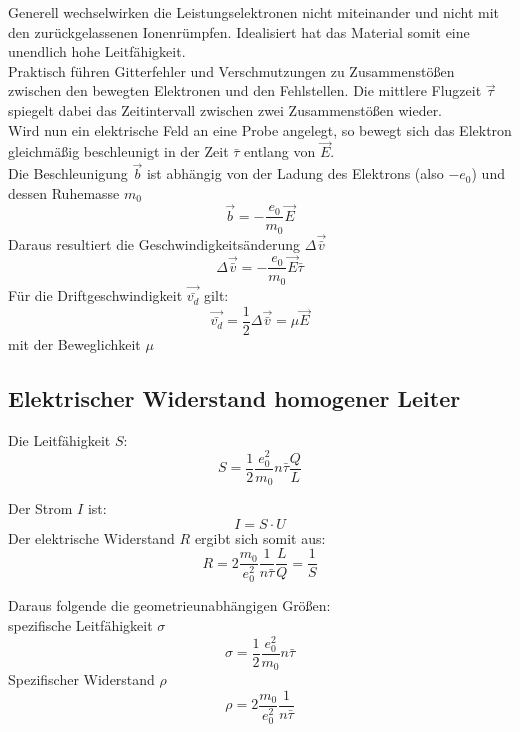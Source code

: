 Generell wechselwirken die Leistungselektronen nicht miteinander und nicht mit den zurückgelassenen Ionenrümpfen.
Idealisiert hat das Material somit eine unendlich hohe Leitfähigkeit.\\
Praktisch führen Gitterfehler und Verschmutzungen zu Zusammenstößen zwischen den bewegten Elektronen und den Fehlstellen.
Die mittlere Flugzeit $\vec{\tau}$ spiegelt dabei das Zeitintervall zwischen zwei Zusammenstößen wieder.\\
Wird nun ein elektrische Feld an eine Probe angelegt, so bewegt sich das Elektron gleichmäßig beschleunigt in der Zeit $\bar{\tau}$
entlang von $\vec{E}$.\\
Die Beschleunigung $\vec{b}$ ist abhängig von der Ladung des Elektrons (also $-e_0$) und dessen Ruhemasse $m_0$ 
\begin{equation}
    \vec{b}=-\frac{e_0}{m_0}\vec{E}
\end{equation}
Daraus resultiert die Geschwindigkeitsänderung $\Delta \vec{\bar{v}}$
\begin{equation}
    \Delta \vec{\bar{v}}=-\frac{e_0}{m_0}\vec{E}\bar{\tau}
\end{equation}
Für die Driftgeschwindigkeit $\vec{\bar{v_d}}$ gilt:
\begin{equation}
    \vec{\bar{v_d}}=\frac{1}{2} \Delta \vec{\bar{v}}=\mu\vec{E}
\end{equation}
mit der Beweglichkeit $\mu$

\subsection{Elektrischer Widerstand homogener Leiter}
Die Leitfähigkeit $S$:
\begin{equation}
    S=\frac{1}{2}\frac{e_0^2}{m_0}n\bar{\tau}\frac{Q}{L}
\end{equation}

Der Strom $I$ ist:
\begin{equation}
    I=S \cdot U
\end{equation}
Der elektrische Widerstand $R$ ergibt sich somit aus:
\begin{equation}
    R=2\frac{m_0}{e_0^2}\frac{1}{n\bar{\tau}}\frac{L}{Q}=\frac{1}{S}
\end{equation}

Daraus folgende die geometrieunabhängigen Größen:\\
spezifische Leitfähigkeit $\sigma$
\begin{equation}
    \sigma = \frac{1}{2}\frac{e_0^2}{m_0}n\bar{\tau}
\end{equation}
Spezifischer Widerstand $\rho$
\begin{equation}
    \rho = 2 \frac{m_0}{e_0^2}\frac{1}{n\bar{\tau}}
\end{equation}



